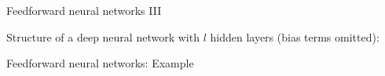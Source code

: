 \documentclass[11pt,compress,t,notes=noshow, xcolor=table]{beamer}
\begin{document}
\begin{framei}{Feedforward neural networks III}
\item Structure of a deep neural network with $l$ hidden layers (bias terms omitted):
\end{framei}  

\begin{frame} {Feedforward neural networks: Example}
\begin{figure}
\centering
{}

\end{figure}
\end{frame}
\end{document}
